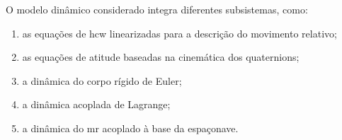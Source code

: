 
O modelo dinâmico considerado integra diferentes subsistemas, como:
\begin{enumerate}[label=(\roman*)]
    \item as equações de \gls{hcw} linearizadas para a descrição do movimento relativo;
    \item as equações de atitude baseadas na cinemática dos quaternions;
    \item a dinâmica do corpo rígido de Euler;
    \item a dinâmica acoplada de Lagrange;
    \item a dinâmica do \gls{mr} acoplado à base da espaçonave.
\end{enumerate}

